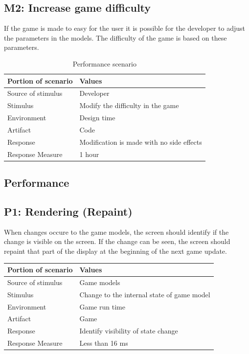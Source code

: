 \subsection* {M2: Increase game difficulty}
If the game is made to easy for the user it is possible for the developer to adjust the
parameters in the models. The difficulty of the game is based on these parameters.

\begin{table}[H]
\begin{tabular}{| l | l |}
	\hline
	\rowcolor{gray}
	{\bf Portion of scenario} & {\bf Values} \\ \hline
	Source of stimulus & Developer\\ \hline
	Stimulus & Modify the difficulty in the game\\ \hline
	Environment & Design time \\ \hline
	Artifact & Code \\ \hline
	Response & Modification is made with no side effects\\ \hline
	Response Measure & 1 hour\\ \hline
\end{tabular}
\caption{Performance scenario}
\end{table}

\subsection{Performance}

\subsection*{P1: Rendering (Repaint)}
When changes occure to the game models, the screen should identify if the change 
is visible on the screen. If the change can be seen, the screen should repaint 
that part of the display at the beginning of the next game update.

\begin{tabular}{| l | l |}
	\hline
	\rowcolor{gray}
	{\bf Portion of scenario} & {\bf Values} \\ \hline
	Source of stimulus & Game models\\ \hline
	Stimulus & Change to the internal state of game model\\ \hline
	Environment & Game run time \\ \hline
	Artifact &  Game \\ \hline
	Response & Identify visibility of state change\\ \hline
	Response Measure & Less than 16 ms\\ \hline
\end{tabular}

